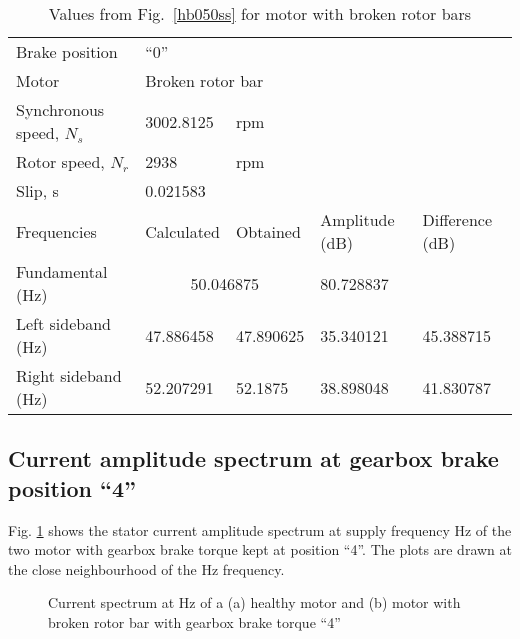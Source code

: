 \documentclass[a4paper,11pt]{report}
\begin{document}
\begin{table}[h]
\centering
\begin{tabular}{lllll}
Brake position	& ``0'' & & & \\			
Motor &	\multicolumn{4}{l}{Broken rotor	bar} \\ 
Synchronous speed, $N_{s}$	& 3002.8125	& rpm & & \\			
Rotor speed, $N_{r}$ 	  	& 2938	& rpm& & \\		
Slip, s			  	& \multicolumn{4}{l}{0.021583} \\			
Frequencies 		  	& Calculated & Obtained & Amplitude (dB) & Difference (dB) \\
Fundamental (Hz)		& \multicolumn{2}{c}{50.046875}	& 80.728837	&  \\ 
Left sideband (Hz) 		& 47.886458 & 47.890625 & 35.340121 & 45.388715\\
Right sideband (Hz)		& 52.207291 & 52.1875 &   38.898048 & 41.830787 
\end{tabular}
\caption{Values from Fig.~\ref{hb050ss} for motor with broken rotor bars} \label{b050sst}
\end{table}

\clearpage
\subsection{Current amplitude spectrum at gearbox brake position ``4''}
Fig. \ref{hb430ss} shows the stator current amplitude spectrum at supply frequency \unit[30]{Hz} of the two motor with gearbox brake torque kept at position ``4''. The plots are drawn at the close neighbourhood of the \unit[30]{Hz} frequency.

\begin{figure}[htbp]
\centering
\subfigure[]{\texttt{[image: h430]}}
\subfigure[]{\texttt{[image: b430]}}
\caption{Current spectrum at \unit[30]{Hz} of a (a) healthy motor and (b) motor with broken rotor bar  with gearbox brake torque ``4''} \label{hb430ss}
\end{figure}
\end{document}
